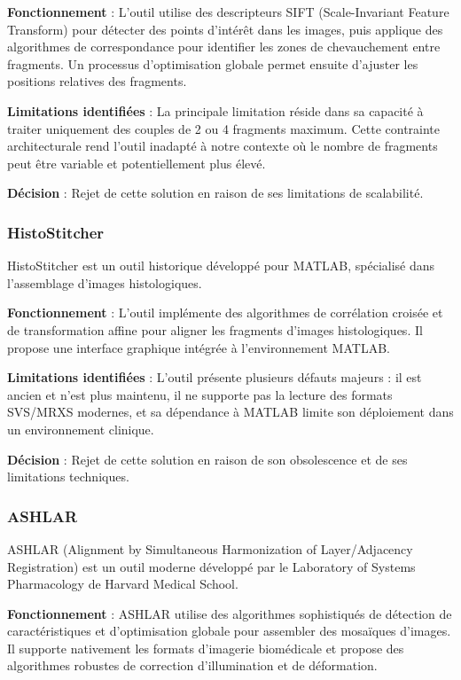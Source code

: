 \documentclass[12pt,a4paper]{report}
\begin{document}
\textbf{Fonctionnement} : L'outil utilise des descripteurs SIFT (Scale-Invariant Feature Transform) pour détecter des points d'intérêt dans les images, puis applique des algorithmes de correspondance pour identifier les zones de chevauchement entre fragments. Un processus d'optimisation globale permet ensuite d'ajuster les positions relatives des fragments.

\textbf{Limitations identifiées} : La principale limitation réside dans sa capacité à traiter uniquement des couples de 2 ou 4 fragments maximum. Cette contrainte architecturale rend l'outil inadapté à notre contexte où le nombre de fragments peut être variable et potentiellement plus élevé.

\textbf{Décision} : Rejet de cette solution en raison de ses limitations de scalabilité.

\subsubsection{HistoStitcher}

HistoStitcher est un outil historique développé pour MATLAB, spécialisé dans l'assemblage d'images histologiques.

\textbf{Fonctionnement} : L'outil implémente des algorithmes de corrélation croisée et de transformation affine pour aligner les fragments d'images histologiques. Il propose une interface graphique intégrée à l'environnement MATLAB.

\textbf{Limitations identifiées} : L'outil présente plusieurs défauts majeurs : il est ancien et n'est plus maintenu, il ne supporte pas la lecture des formats SVS/MRXS modernes, et sa dépendance à MATLAB limite son déploiement dans un environnement clinique.

\textbf{Décision} : Rejet de cette solution en raison de son obsolescence et de ses limitations techniques.

\subsubsection{ASHLAR}

ASHLAR (Alignment by Simultaneous Harmonization of Layer/Adjacency Registration) est un outil moderne développé par le Laboratory of Systems Pharmacology de Harvard Medical School.

\textbf{Fonctionnement} : ASHLAR utilise des algorithmes sophistiqués de détection de caractéristiques et d'optimisation globale pour assembler des mosaïques d'images. Il supporte nativement les formats d'imagerie biomédicale et propose des algorithmes robustes de correction d'illumination et de déformation.
\end{document}
